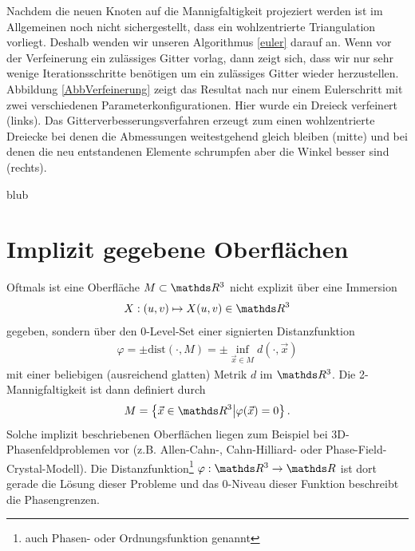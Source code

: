       Nachdem die neuen Knoten auf die Mannigfaltigkeit projeziert werden ist im Allgemeinen noch nicht sichergestellt, dass ein wohlzentrierte
      Triangulation vorliegt. Deshalb wenden wir unseren Algorithmus \eqref{euler} darauf an.
      Wenn vor der Verfeinerung ein zulässiges Gitter vorlag, dann zeigt sich, dass wir nur sehr wenige Iterationsschritte benötigen um ein
      zulässiges Gitter wieder herzustellen. Abbildung \ref{AbbVerfeinerung} zeigt das Resultat nach nur einem Eulerschritt mit zwei verschiedenen
      Parameterkonfigurationen. Hier wurde ein Dreieck verfeinert (links). Das Gitterverbesserungsverfahren erzeugt zum einen wohlzentrierte
      Dreiecke bei denen die Abmessungen weitestgehend gleich bleiben (mitte) und bei denen die neu entstandenen Elemente schrumpfen aber die Winkel
      besser sind (rechts).

     \begin{fazit}
        blub
     \end{fazit}





  \section{Implizit gegebene Oberflächen}
    Oftmals ist eine Oberfläche \( M\subset\R^{3} \) nicht explizit über eine Immersion 
    \begin{align}
      X:(u,v)\mapsto X(u,v)\in\R^{3}
    \end{align}
    gegeben, sondern über den 0-Level-Set einer signierten Distanzfunktion
    \begin{align}
      \varphi = \pm\text{dist}(\cdot,M) = \pm\inf_{\vec{x}\in M} d(\cdot,\vec{x})
    \end{align}
    mit einer beliebigen (ausreichend glatten) Metrik \( d \) im \( \R^{3} \).
    Die 2-Mannigfaltigkeit ist dann definiert durch 
    \begin{align}
      M = \left\{ \vec{x}\in\R^{3} \middle| \varphi(\vec{x})=0 \right\} \text{.}
    \end{align}
    Solche implizit beschriebenen Oberflächen liegen zum Beispiel bei 3D-Phasenfeldproblemen vor 
    (z.B. Allen-Cahn-, Cahn-Hilliard- oder Phase-Field-Crystal-Modell). 
    Die Distanzfunktion\footnote{auch Phasen- oder Ordnungsfunktion genannt} \( \varphi:\R^{3}\rightarrow\R \) ist dort gerade die Lösung dieser Probleme
    und das 0-Niveau dieser Funktion beschreibt die Phasengrenzen.

